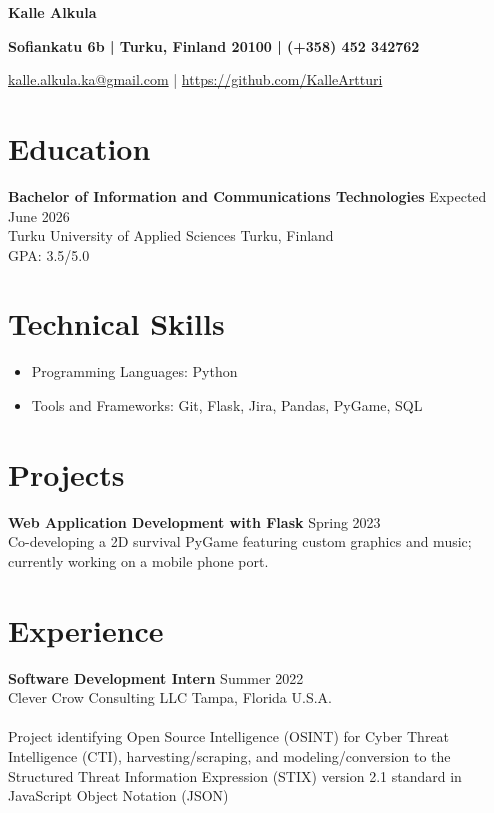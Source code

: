 \documentclass[11pt, letterpaper]{article}
\begin{document}
\begin{center}

\textbf{Kalle Alkula}

\textbf{Sofiankatu 6b | Turku, Finland 20100 | (+358) 452 342762}\

\href{mailto:kalle.alkula.ka@gmail.com}{kalle.alkula.ka@gmail.com} | \href{https://github.com/KalleArtturi}{https://github.com/KalleArtturi}
\end{center}

\section*{Education}
\textbf{Bachelor of Information and Communications Technologies} \hfill Expected June 2026\\
 Turku University of Applied Sciences  \hfill Turku, Finland\\
GPA: 3.5/5.0

\section*{Technical Skills}
\begin{itemize}[leftmargin=*,noitemsep,topsep=-17pt]
	\item Programming Languages: Python 
	\item Tools and Frameworks: Git, Flask, Jira, Pandas, PyGame, SQL 
\end{itemize}

\section*{Projects}

\textbf{Web Application Development with Flask} \hfill Spring 2023\\
 Co-developing a 2D survival PyGame featuring custom graphics and music; currently working on a mobile phone port.

\section*{Experience}
\textbf{Software Development Intern} \hfill Summer 2022\\
Clever Crow Consulting LLC \hfill Tampa, Florida U.S.A.\\
\\
Project identifying Open Source Intelligence (OSINT) for Cyber Threat Intelligence (CTI), harvesting/scraping, and modeling/conversion to the Structured Threat Information Expression (STIX) version 2.1 standard in JavaScript Object Notation (JSON)
\end{document}
